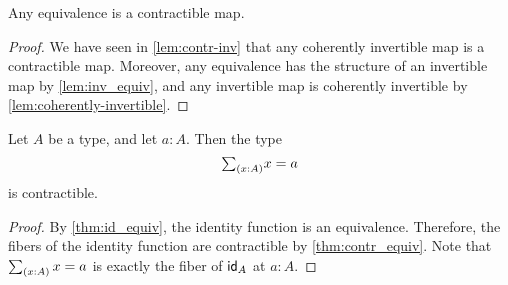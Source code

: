 \begin{thm}\label{thm:contr_equiv}
Any equivalence is a contractible map.
\end{thm}

\begin{proof}
  We have seen in \cref{lem:contr-inv} that any coherently invertible map is a contractible map. Moreover, any equivalence has the structure of an invertible map by \cref{lem:inv_equiv}, and any invertible map is coherently invertible by \cref{lem:coherently-invertible}.
\end{proof}

\begin{cor}\label{cor:contr_path}
Let $A$ be a type, and let $a:A$. Then the type
\begin{equation*}
\sm{x:A}x=a
\end{equation*}
is contractible.
\end{cor}

\begin{proof}
By \cref{thm:id_equiv}, the identity function is an equivalence. Therefore, the fibers of the identity function are contractible by \cref{thm:contr_equiv}. Note that $\sm{x:A}x=a$ is exactly the fiber of $\idfunc[A]$ at $a:A$.
\end{proof}

